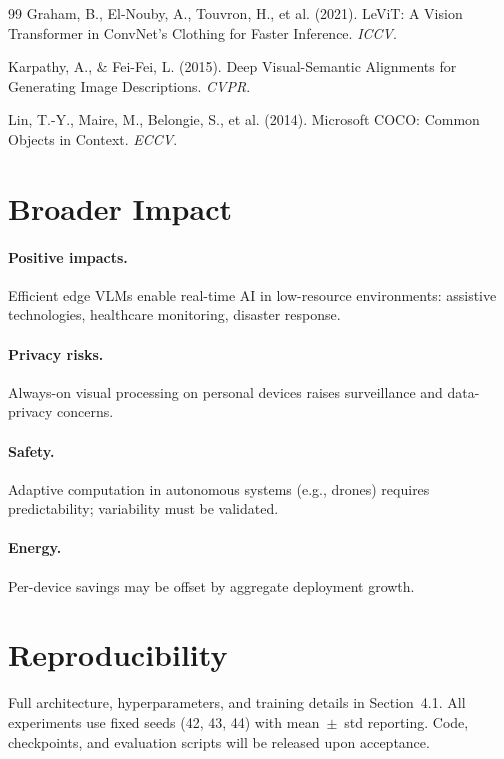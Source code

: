 \documentclass{article}
\begin{document}
{\begin{thebibliography}{99}
Graham, B., El-Nouby, A., Touvron, H., et al. (2021). LeViT: A Vision Transformer in ConvNet's Clothing for Faster Inference. \emph{ICCV}.

Karpathy, A., \& Fei-Fei, L. (2015). Deep Visual-Semantic Alignments for Generating Image Descriptions. \emph{CVPR}.

Lin, T.-Y., Maire, M., Belongie, S., et al. (2014). Microsoft COCO: Common Objects in Context. \emph{ECCV}.

\end{thebibliography}
}



\appendix

\section{Broader Impact}

\paragraph{Positive impacts.}
Efficient edge VLMs enable real-time AI in low-resource environments: assistive technologies, healthcare monitoring, disaster response.

\paragraph{Privacy risks.}
Always-on visual processing on personal devices raises surveillance and data-privacy concerns.

\paragraph{Safety.}
Adaptive computation in autonomous systems (e.g., drones) requires predictability; variability must be validated.

\paragraph{Energy.}
Per-device savings may be offset by aggregate deployment growth.

\section{Reproducibility}

Full architecture, hyperparameters, and training details in Section~4.1. All experiments use fixed seeds (42, 43, 44) with mean~$\pm$~std reporting. Code, checkpoints, and evaluation scripts will be released upon acceptance.
\end{document}
